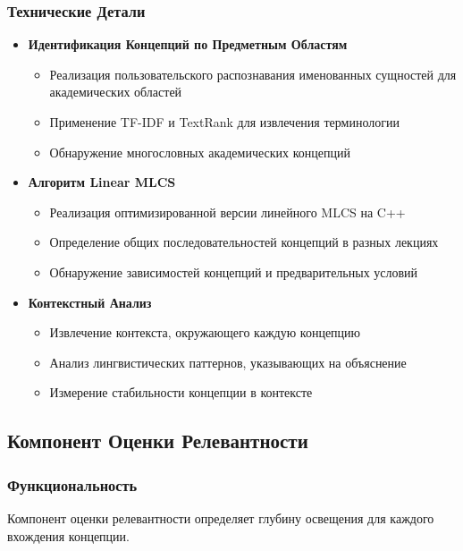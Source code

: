 \documentclass[12pt,a4paper]{article}
\begin{document}
\subsubsection{Технические Детали}
\begin{itemize}
    \item \textbf{Идентификация Концепций по Предметным Областям}
    \begin{itemize}
        \item Реализация пользовательского распознавания именованных сущностей для академических областей
        \item Применение TF-IDF и TextRank для извлечения терминологии
        \item Обнаружение многословных академических концепций
    \end{itemize}

    \item \textbf{Алгоритм Linear MLCS}
    \begin{itemize}
        \item Реализация оптимизированной версии линейного MLCS на C++
        \item Определение общих последовательностей концепций в разных лекциях
        \item Обнаружение зависимостей концепций и предварительных условий
    \end{itemize}

    \item \textbf{Контекстный Анализ}
    \begin{itemize}
        \item Извлечение контекста, окружающего каждую концепцию
        \item Анализ лингвистических паттернов, указывающих на объяснение
        \item Измерение стабильности концепции в контексте
    \end{itemize}
\end{itemize}

\subsection{Компонент Оценки Релевантности}

\subsubsection{Функциональность}
Компонент оценки релевантности определяет глубину освещения для каждого вхождения концепции.
\end{document}
